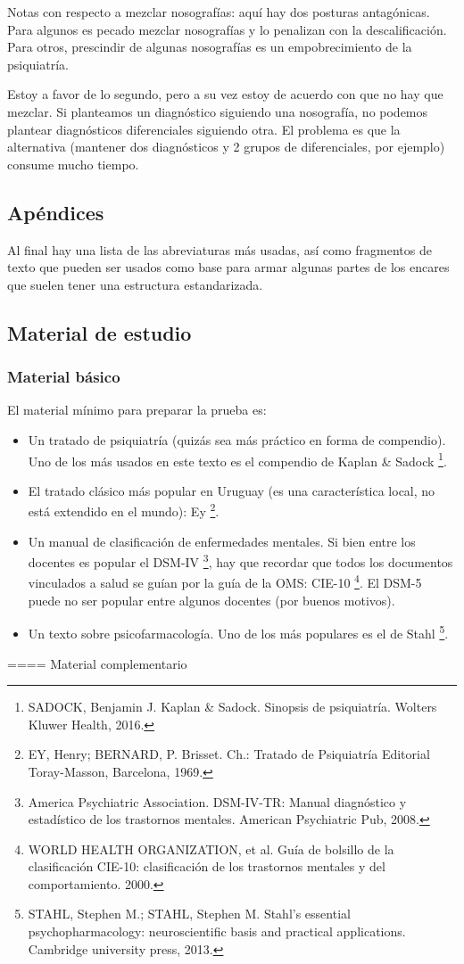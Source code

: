 \documentclass[encares.tex]{subfiles}
\begin{document}
Notas con respecto a mezclar nosografías: aquí hay dos posturas antagónicas. Para algunos es pecado mezclar nosografías y lo penalizan con la descalificación. Para otros, prescindir de algunas nosografías es un empobrecimiento de la psiquiatría.

Estoy a favor de lo segundo, pero a su vez estoy de acuerdo con que no hay que mezclar. Si planteamos un diagnóstico siguiendo una nosografía, no podemos plantear diagnósticos diferenciales siguiendo otra. El problema es que la alternativa (mantener dos diagnósticos y 2 grupos de diferenciales, por ejemplo) consume mucho tiempo.

\subsection*{Apéndices}

Al final hay una lista de las abreviaturas más usadas, así como fragmentos de texto que pueden ser usados como base para armar algunas partes de los encares que suelen tener una estructura estandarizada.

\subsection*{Material de estudio}
\subsubsection*{Material básico}

El material mínimo para preparar la prueba es:
\begin{itemize}
\item Un tratado de psiquiatría (quizás sea más práctico en forma de compendio). Uno de los más usados en este texto es el compendio de Kaplan \& Sadock \footnote{SADOCK, Benjamin J. Kaplan \& Sadock. Sinopsis de psiquiatría. Wolters Kluwer Health, 2016.}.
\item El tratado clásico más popular en Uruguay (es una característica local, no está extendido en el mundo): Ey \footnote{EY, Henry; BERNARD, P. Brisset. Ch.: Tratado de Psiquiatría Editorial Toray-Masson, Barcelona, 1969.}.
\item Un manual de clasificación de enfermedades mentales. Si bien entre los docentes es popular el DSM-IV \footnote{America Psychiatric Association. DSM-IV-TR: Manual diagnóstico y estadístico de los trastornos mentales. American Psychiatric Pub, 2008.}, hay que recordar que todos los documentos vinculados a salud se guían por la guía de la OMS: CIE-10 \footnote{WORLD HEALTH ORGANIZATION, et al. Guía de bolsillo de la clasificación CIE-10: clasificación de los trastornos mentales y del comportamiento. 2000.}. El DSM-5 puede no ser popular entre algunos docentes (por buenos motivos).
\item Un texto sobre psicofarmacología. Uno de los más populares es el de Stahl \footnote{STAHL, Stephen M.; STAHL, Stephen M. Stahl's essential psychopharmacology: neuroscientific basis and practical applications. Cambridge university press, 2013.}.
\end{itemize}
==== Material complementario
\end{document}
